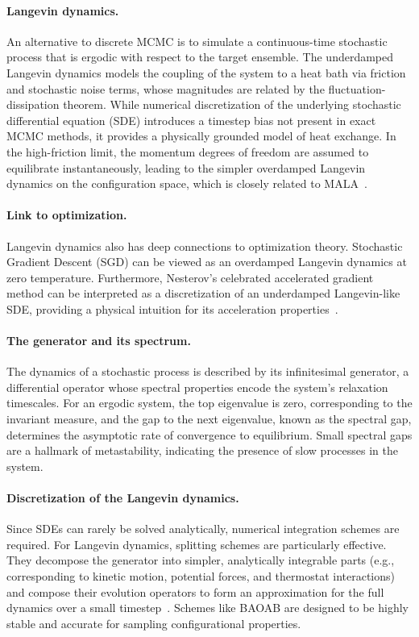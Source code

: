 \paragraph{Langevin dynamics.} An alternative to discrete MCMC is to simulate a continuous-time stochastic process that is ergodic with respect to the target ensemble. The underdamped Langevin dynamics models the coupling of the system to a heat bath via friction and stochastic noise terms, whose magnitudes are related by the fluctuation-dissipation theorem. While numerical discretization of the underlying stochastic differential equation (SDE) introduces a timestep bias not present in exact MCMC methods, it provides a physically grounded model of heat exchange. In the high-friction limit, the momentum degrees of freedom are assumed to equilibrate instantaneously, leading to the simpler overdamped Langevin dynamics on the configuration space, which is closely related to MALA~\cite{BLS25a}.

\paragraph{Link to optimization.} Langevin dynamics also has deep connections to optimization theory. Stochastic Gradient Descent (SGD) can be viewed as an overdamped Langevin dynamics at zero temperature. Furthermore, Nesterov's celebrated accelerated gradient method can be interpreted as a discretization of an underdamped Langevin-like SDE, providing a physical intuition for its acceleration properties~\cite{BLS25a}.

\paragraph{The generator and its spectrum.} The dynamics of a stochastic process is described by its infinitesimal generator, a differential operator whose spectral properties encode the system's relaxation timescales. For an ergodic system, the top eigenvalue is zero, corresponding to the invariant measure, and the gap to the next eigenvalue, known as the spectral gap, determines the asymptotic rate of convergence to equilibrium. Small spectral gaps are a hallmark of metastability, indicating the presence of slow processes in the system.

\paragraph{Discretization of the Langevin dynamics.} Since SDEs can rarely be solved analytically, numerical integration schemes are required. For Langevin dynamics, splitting schemes are particularly effective. They decompose the generator into simpler, analytically integrable parts (e.g., corresponding to kinetic motion, potential forces, and thermostat interactions) and compose their evolution operators to form an approximation for the full dynamics over a small timestep~\cite{BLS25a}. Schemes like BAOAB are designed to be highly stable and accurate for sampling configurational properties.

